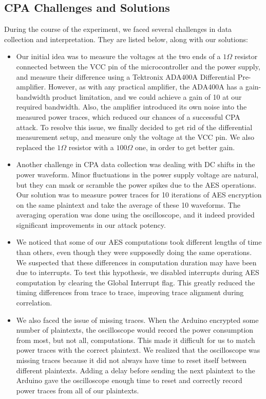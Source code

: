 \documentclass[journal]{ieee_style}
\begin{document}
\subsection{CPA Challenges and Solutions}
During the course of the experiment, we faced several challenges in data collection and interpretation. They are listed below, along with our solutions:
\begin{itemize}
\item Our initial idea was to measure the voltages at the two ends of a $1\Omega$ resistor connected between the VCC pin of the microcontroller and the power supply, and measure their difference using a Tektronix ADA400A Differential Pre-amplifier. However, as with any practical amplifier, the ADA400A has a gain-bandwidth product limitation, and we could achieve a gain of 10 at our required bandwidth. Also, the amplifier introduced its own noise into the measured power traces, which reduced our chances of a successful CPA attack. To resolve this issue, we finally decided to get rid of the differential measurement setup, and measure only the voltage at the VCC pin. We also replaced the $1\Omega$ resistor with a $100\Omega$ one, in order to get better gain.
\item Another challenge in CPA data collection was dealing with DC shifts in the power waveform. Minor fluctuations in the power supply voltage are natural, but they can mask or scramble the power spikes due to the AES operations. Our solution was to measure power traces for 10 iterations of AES encryption on the same plaintext and take the average of these 10 waveforms.  The averaging operation was done using the oscilloscope, and it indeed provided significant improvements in our attack potency. 
\item We noticed that some of our AES computations took different lengths of time than others, even though they were supposedly doing the same operations. We suspected that these differences in computation duration may have been due to interrupts. To test this hypothesis, we disabled interrupts during AES computation by clearing the Global Interrupt flag. This greatly reduced the timing differences from trace to trace, improving trace alignment during correlation.
\item We also faced the issue of missing traces. When the Arduino encrypted some number of plaintexts, the oscilloscope would record the power consumption from most, but not all, computations. This made it difficult for us to match power traces with the correct plaintext. We realized that the oscilloscope was missing traces because it did not always have time to reset itself between different plaintexts. Adding a delay before sending the next plaintext to the Arduino gave the oscilloscope enough time to reset and correctly record power traces from all of our plaintexts.

\end{itemize}
\end{document}
